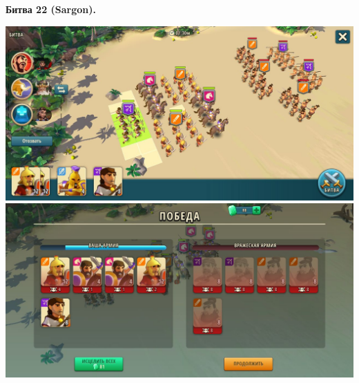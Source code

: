 \newpage
\begin{center}
	\hypertarget{fight22}{\textbf{Битва 22 (Sargon).}}
\end{center}
\noindent\includegraphics[width=\linewidth]{./parts/media/TreasureHunt/22/sargon/photo_2022-04-06_18-12-03.jpg} \newline
\noindent\includegraphics[width=\linewidth]{./parts/media/TreasureHunt/22/sargon/photo_2022-04-06_18-12-13.jpg} \newline

